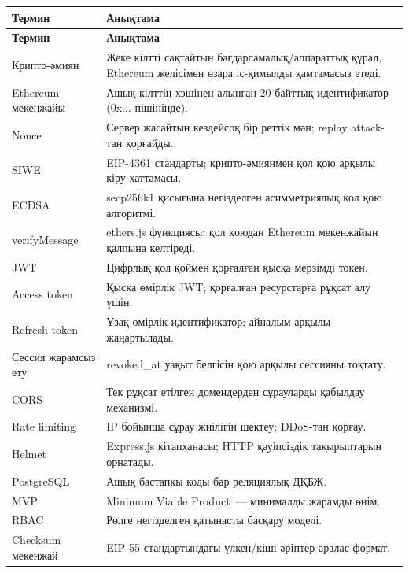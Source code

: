 \documentclass[14pt,a4paper]{extarticle}
\begin{document}
\begin{longtable}{|p{4.2cm}|p{10.0cm}|}
\hline\textbf{Термин} & \textbf{Анықтама}\\\hline
\endfirsthead\hline\textbf{Термин} & \textbf{Анықтама}\\\hline\endhead
Крипто-әмиян & Жеке кілтті сақтайтын бағдарламалық/аппараттық құрал, Ethereum желісімен өзара іс-қимылды қамтамасыз етеді.\\\hline
Ethereum мекенжайы & Ашық кілттің хэшінен алынған 20 байттық идентификатор (0x... пішінінде).\\\hline
Nonce & Сервер жасайтын кездейсоқ бір реттік мән; replay attack-тан қорғайды.\\\hline
SIWE & EIP-4361 стандарты; крипто-әмиянмен қол қою арқылы кіру хаттамасы.\\\hline
ECDSA & secp256k1 қисығына негізделген асимметриялық қол қою алгоритмі.\\\hline
verifyMessage & ethers.js функциясы; қол қоюдан Ethereum мекенжайын қалпына келтіреді.\\\hline
JWT & Цифрлық қол қоймен қорғалған қысқа мерзімді токен.\\\hline
Access token & Қысқа өмірлік JWT; қорғалған ресурстарға рұқсат алу үшін.\\\hline
Refresh token & Ұзақ өмірлік идентификатор; айналым арқылы жаңартылады.\\\hline
Сессия жарамсыз ету & revoked\_at уақыт белгісін қою арқылы сессияны тоқтату.\\\hline
CORS & Тек рұқсат етілген домендерден сұрауларды қабылдау механизмі.\\\hline
Rate limiting & IP бойынша сұрау жиілігін шектеу; DDoS-тан қорғау.\\\hline
Helmet & Express.js кітапханасы; HTTP қауіпсіздік тақырыптарын орнатады.\\\hline
PostgreSQL & Ашық бастапқы коды бар реляциялық ДҚБЖ.\\\hline
MVP & Minimum Viable Product~--- минималды жарамды өнім.\\\hline
RBAC & Рөлге негізделген қатынасты басқару моделі.\\\hline
Checksum мекенжай & EIP-55 стандартындағы үлкен/кіші әріптер аралас формат.\\\hline
\end{longtable}
\end{document}
